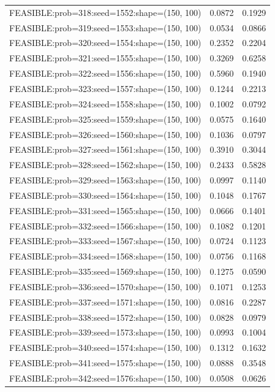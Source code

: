 \begin{longtable}{lcc}
FEASIBLE:prob=318:seed=1552:shape=(150, 100) &   0.0872 & 0.1929 \\
FEASIBLE:prob=319:seed=1553:shape=(150, 100) &   0.0534 & 0.0866 \\
FEASIBLE:prob=320:seed=1554:shape=(150, 100) &   0.2352 & 0.2204 \\
FEASIBLE:prob=321:seed=1555:shape=(150, 100) &   0.3269 & 0.6258 \\
FEASIBLE:prob=322:seed=1556:shape=(150, 100) &   0.5960 & 0.1940 \\
FEASIBLE:prob=323:seed=1557:shape=(150, 100) &   0.1244 & 0.2213 \\
FEASIBLE:prob=324:seed=1558:shape=(150, 100) &   0.1002 & 0.0792 \\
FEASIBLE:prob=325:seed=1559:shape=(150, 100) &   0.0575 & 0.1640 \\
FEASIBLE:prob=326:seed=1560:shape=(150, 100) &   0.1036 & 0.0797 \\
FEASIBLE:prob=327:seed=1561:shape=(150, 100) &   0.3910 & 0.3044 \\
FEASIBLE:prob=328:seed=1562:shape=(150, 100) &   0.2433 & 0.5828 \\
FEASIBLE:prob=329:seed=1563:shape=(150, 100) &   0.0997 & 0.1140 \\
FEASIBLE:prob=330:seed=1564:shape=(150, 100) &   0.1048 & 0.1767 \\
FEASIBLE:prob=331:seed=1565:shape=(150, 100) &   0.0666 & 0.1401 \\
FEASIBLE:prob=332:seed=1566:shape=(150, 100) &   0.1082 & 0.1201 \\
FEASIBLE:prob=333:seed=1567:shape=(150, 100) &   0.0724 & 0.1123 \\
FEASIBLE:prob=334:seed=1568:shape=(150, 100) &   0.0756 & 0.1168 \\
FEASIBLE:prob=335:seed=1569:shape=(150, 100) &   0.1275 & 0.0590 \\
FEASIBLE:prob=336:seed=1570:shape=(150, 100) &   0.1071 & 0.1253 \\
FEASIBLE:prob=337:seed=1571:shape=(150, 100) &   0.0816 & 0.2287 \\
FEASIBLE:prob=338:seed=1572:shape=(150, 100) &   0.0828 & 0.0979 \\
FEASIBLE:prob=339:seed=1573:shape=(150, 100) &   0.0993 & 0.1004 \\
FEASIBLE:prob=340:seed=1574:shape=(150, 100) &   0.1312 & 0.1632 \\
FEASIBLE:prob=341:seed=1575:shape=(150, 100) &   0.0888 & 0.3548 \\
FEASIBLE:prob=342:seed=1576:shape=(150, 100) &   0.0508 & 0.0626 \\

\end{longtable}
